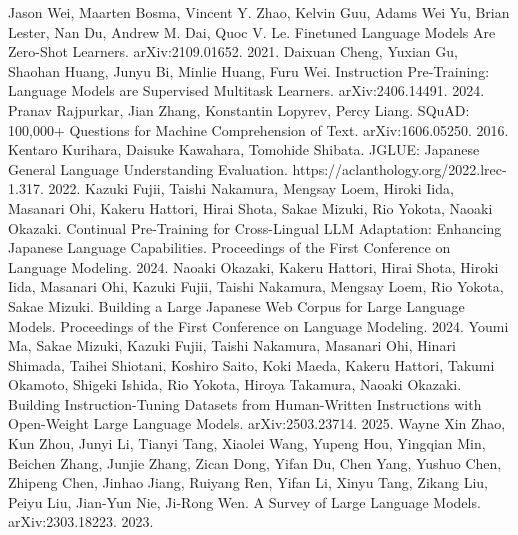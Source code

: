 \documentclass[twocolumn]{jsarticle}
\begin{document}
\begin{thebibliography}{99}
  Jason Wei, Maarten Bosma, Vincent Y. Zhao, Kelvin Guu, Adams Wei Yu, Brian Lester, Nan Du, Andrew M. Dai, Quoc V. Le. Finetuned Language Models Are Zero-Shot Learners. arXiv:2109.01652. 2021.
  Daixuan Cheng, Yuxian Gu, Shaohan Huang, Junyu Bi, Minlie Huang, Furu Wei. Instruction Pre-Training: Language Models are Supervised Multitask Learners. arXiv:2406.14491. 2024.
  Pranav Rajpurkar, Jian Zhang, Konstantin Lopyrev, Percy Liang. SQuAD: 100,000+ Questions for Machine Comprehension of Text. arXiv:1606.05250. 2016.
  Kentaro Kurihara, Daisuke Kawahara, Tomohide Shibata. JGLUE: Japanese General Language Understanding Evaluation. https://aclanthology.org/2022.lrec-1.317. 2022.
  Kazuki Fujii, Taishi Nakamura, Mengsay Loem, Hiroki Iida, Masanari Ohi, Kakeru Hattori, Hirai Shota, Sakae Mizuki, Rio Yokota, Naoaki Okazaki. Continual Pre-Training for Cross-Lingual LLM Adaptation: Enhancing Japanese Language Capabilities. Proceedings of the First Conference on Language Modeling. 2024.
  Naoaki Okazaki, Kakeru Hattori, Hirai Shota, Hiroki Iida, Masanari Ohi, Kazuki Fujii, Taishi Nakamura, Mengsay Loem, Rio Yokota, Sakae Mizuki. Building a Large Japanese Web Corpus for Large Language Models. Proceedings of the First Conference on Language Modeling. 2024.
  Youmi Ma, Sakae Mizuki, Kazuki Fujii, Taishi Nakamura, Masanari Ohi, Hinari Shimada, Taihei Shiotani, Koshiro Saito, Koki Maeda, Kakeru Hattori, Takumi Okamoto, Shigeki Ishida, Rio Yokota, Hiroya Takamura, Naoaki Okazaki. Building Instruction-Tuning Datasets from Human-Written Instructions with Open-Weight Large Language Models. arXiv:2503.23714. 2025.
  Wayne Xin Zhao, Kun Zhou, Junyi Li, Tianyi Tang, Xiaolei Wang, Yupeng Hou, Yingqian Min, Beichen Zhang, Junjie Zhang, Zican Dong, Yifan Du, Chen Yang, Yushuo Chen, Zhipeng Chen, Jinhao Jiang, Ruiyang Ren, Yifan Li, Xinyu Tang, Zikang Liu, Peiyu Liu, Jian-Yun Nie, Ji-Rong Wen. A Survey of Large Language Models. arXiv:2303.18223. 2023.
\end{thebibliography}
\end{document}
